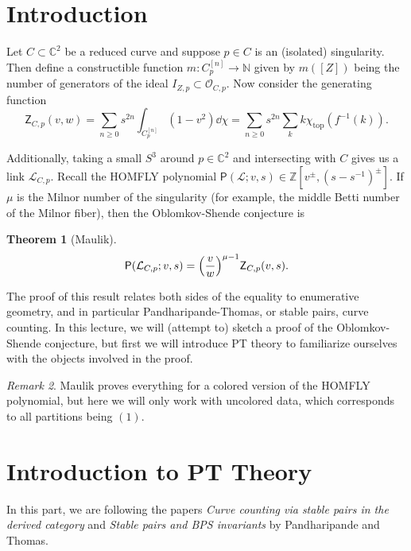 \documentclass[leqno, openany]{memoir}
\newtheorem{thm}{Theorem}[section]
\theoremstyle{definition}
\theoremstyle{remark}
\newtheorem{rmk}[thm]{Remark}
\theoremstyle{plain}
\theoremstyle{definition}
\theoremstyle{remark}
\newcommand{\N}{\mathbb{N}}
\newcommand{\C}{\mathbb{C}}
\newcommand{\Z}{\mathbb{Z}}
\newcommand{\mc}[1]{\mathcal{#1}}
\newcommand{\mr}[1]{\mathrm{#1}}
\newcommand{\ms}[1]{\mathsf{#1}}
\newcommand{\1}{\mathbf{1}}
\newcommand{\2}{\mathbf{2}}
\newcommand{\3}{\mathbf{3}}
\begin{document}
\section{Introduction}%
\label{sec:introduction}

Let $C \subset \C^2$ be a reduced curve and suppose $p \in C$ is an (isolated) singularity. Then define a constructible function $m \colon C_p^{[n]} \to \N$ given by $m([Z])$ being the number of generators of the ideal $I_{Z,p} \subset \mc{O}_{C,p}$. Now consider the generating function
\[ \ms{Z}_{C,p}(v, w) = \sum_{n \geq 0} s^{2n} \int_{C_p^{[n]}} (1-v^2) \dd{\chi} = \sum_{n \geq 0} s^{2n} \sum_k k \chi_{\mr{top}}(f^{-1}(k)). \]

Additionally, taking a small $S^3$ around $p \in \C^2$ and intersecting with $C$ gives us a link $\mc{L}_{C,p}$. Recall the HOMFLY polynomial $\ms{P}(\mc{L}; v, s) \in \Z[v^{\pm}, {(s-s^{-1})}^{\pm}]$. If $\mu$ is the Milnor number of the singularity (for example, the middle Betti number of the Milnor fiber), then the Oblomkov-Shende conjecture is
\begin{thm}[Maulik]
    \[ \ms{P}(\mc{L}_{C,p}; v,s) = {\qty(\frac{v}{w})}^{\mu - 1} \ms{Z}_{C,p}(v,s). \]
\end{thm}

The proof of this result relates both sides of the equality to enumerative geometry, and in particular Pandharipande-Thomas, or stable pairs, curve counting. In this lecture, we will (attempt to) sketch a proof of the Oblomkov-Shende conjecture, but first we will introduce PT theory to familiarize ourselves with the objects involved in the proof.

\begin{rmk}
    Maulik proves everything for a colored version of the HOMFLY polynomial, but here we will only work with uncolored data, which corresponds to all partitions being $(1)$.
\end{rmk}

\section{Introduction to PT Theory}%
\label{sec:introduction_to_pt_theory}

In this part, we are following the papers \textit{Curve counting via stable pairs in the derived category} and \textit{Stable pairs and BPS invariants} by Pandharipande and Thomas.
\end{document}
